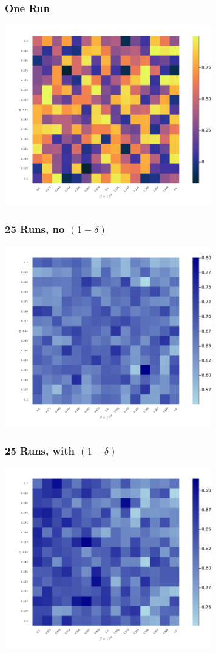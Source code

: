 \documentclass{beamer}
\begin{document}
\begin{frame}\frametitle{One Run}
	\begin{center}
		\includegraphics[width=9cm]{heatmap_profit_gain_once.png}
	\end{center}
\end{frame}


\begin{frame}\frametitle{25 Runs, no $(1-\delta)$}
	\begin{center}
		\includegraphics[width=9cm]{heatmap_profit_gain_25_nodelta.png}
	\end{center}
\end{frame}

\begin{frame}\frametitle{25 Runs, with $(1-\delta)$}
	\begin{center}
		\includegraphics[width=9cm]{heatmap_profit_gain_25_delta.png}
	\end{center}
\end{frame}
\end{document}
